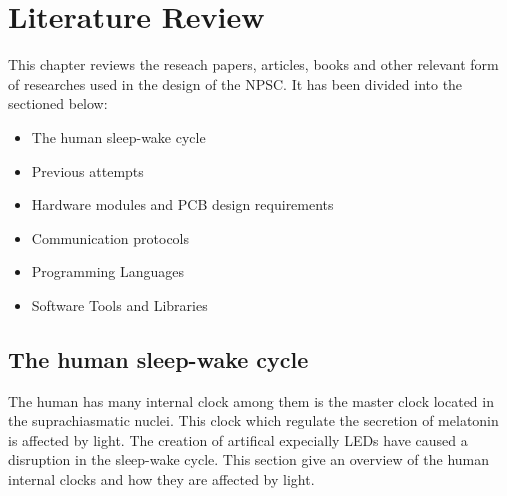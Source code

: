 \chapter{Literature Review}

This chapter reviews the reseach papers, articles, books and other relevant form of researches used in the design of the NPSC. It has been divided into the sectioned below:
\begin{itemize}
\item The human sleep-wake cycle
\item Previous attempts
\item Hardware modules and PCB design requirements
\item Communication protocols
\item Programming Languages
\item Software Tools and Libraries
\end{itemize}

\section{The human sleep-wake cycle}

The human has many internal clock among them is the master clock located in the suprachiasmatic nuclei. This clock which regulate the secretion of melatonin is affected by light. The creation of artifical expecially LEDs have caused a disruption in the sleep-wake cycle. This section give an overview of the human internal clocks and how they are affected by light.

